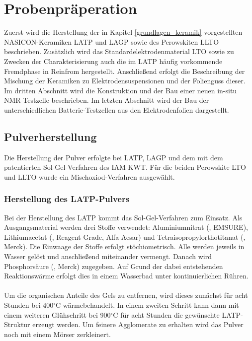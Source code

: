 \documentclass[a4paper, 11pt, headsepline,footsepline,twoside,abstract]{scrbook}
\begin{document}

\chapter{Probenpräperation}
Zuerst wird die Herstellung der in Kapitel \ref{grundlagen_keramik} vorgestellten NASICON-Keramiken LATP und LAGP sowie des Perowskiten LLTO beschrieben. Zusätzlich wird das Standardelektrodenmaterial LTO sowie zu Zwecken der Charakterisierung auch die im LATP häufig vorkommende Fremdphase  in Reinfrom hergestellt. Anschließend erfolgt die Beschreibung der Mischung der Keramiken zu Elektrodensuspensionen und der Folienguss dieser. Im dritten Abschnitt wird die Konstruktion und der Bau einer neuen in-situ NMR-Testzelle beschrieben. Im letzten Abschnitt wird der Bau der unterschiedlichen Batterie-Testzellen aus den Elektrodenfolien dargestellt. 
\section{Pulverherstellung}
Die Herstellung der Pulver erfolgte bei LATP, LAGP und dem  mit dem patentierten Sol-Gel-Verfahren des IAM-KWT. Für die beiden Perowskite LTO und LLTO wurde ein Mischoxiod-Verfahren ausgewählt.
\subsection{Herstellung des LATP-Pulvers}
\label{praep_LATP}
Bei der Herstellung des LATP kommt das Sol-Gel-Verfahren zum Einsatz. Als Ausgangsmaterial werden drei Stoffe verwendet: Aluminiumnitrat (, EMSURE), Lithiumacetat (, Reagent Grade, Alfa Aesar) und Tetra\-iso\-propyl\-ortho\-titanat (, Merck). Die Einwaage der Stoffe erfolgt stöchiometrisch. Alle werden jeweils in Wasser gelöst und anschließend miteinander vermengt. Danach wird Phosphorsäure (, Merck) zugegeben. Auf Grund der dabei entstehenden Reaktionswärme erfolgt dies in einem Wasserbad unter kontinuierlichen Rühren.
\\\\
Um die organischen Anteile des Gels zu entfernen, wird dieses zunächst für acht Stunden bei 400$^\circ$C wärmebehandelt. In einem zweiten Schritt kann dann mit einem weiteren Glühschritt bei 900$^\circ$C für acht Stunden die gewünschte LATP-Struktur erzeugt werden. Um feinere Agglomerate zu erhalten wird das Pulver noch mit einem Mörser zerkleinert.
\end{document}
